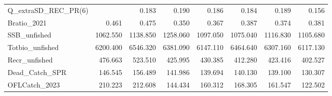 \documentclass[
  english,
  a4paper,
]{article}
\begin{document}
\begin{table}
{\begin{tabular}[t]{lrrrrrrr}
Q\_extraSD\_REC\_PR(6) &  & 0.183 & 0.190 & 0.186 & 0.184 & 0.189 & 0.156\\
Bratio\_2021 & 0.461 & 0.475 & 0.350 & 0.367 & 0.387 & 0.374 & 0.381\\
SSB\_unfished & 1062.550 & 1138.850 & 1258.060 & 1097.050 & 1075.040 & 1116.830 & 1105.680\\
Totbio\_unfished & 6200.400 & 6546.320 & 6381.090 & 6147.110 & 6464.640 & 6307.160 & 6117.130\\
Recr\_unfished & 476.663 & 523.510 & 425.995 & 430.385 & 412.280 & 423.416 & 402.527\\
Dead\_Catch\_SPR & 146.545 & 156.489 & 141.986 & 139.694 & 140.130 & 139.100 & 130.307\\
OFLCatch\_2023 & 210.223 & 212.608 & 144.434 & 160.312 & 168.305 & 161.547 & 122.502\\
\bottomrule
\end{tabular}}
\end{table}
\end{document}
